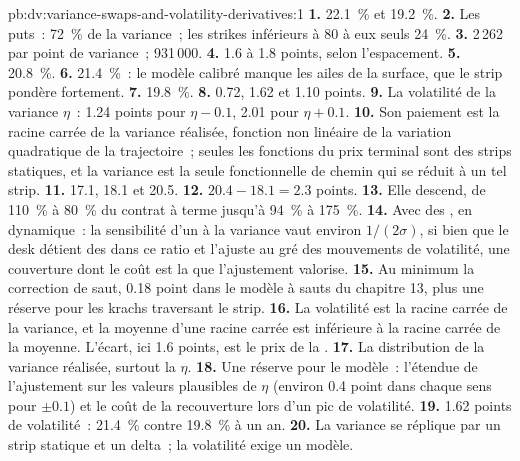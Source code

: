 \begin{solution}{pb:dv:variance-swaps-and-volatility-derivatives:1}
\textbf{1.} 22.1~\% et 19.2~\%.
\textbf{2.} Les puts~: 72~\% de la variance~; les strikes inférieurs à 80 à eux seuls 24~\%.
\textbf{3.} 2\,262 par point de variance~; 931\,000.
\textbf{4.} 1.6 à 1.8 points, selon l'espacement.
\textbf{5.} 20.8~\%.
\textbf{6.} 21.4~\%~: le modèle calibré manque les ailes de la surface, que le strip pondère fortement.
\textbf{7.} 19.8~\%.
\textbf{8.} 0.72, 1.62 et 1.10 points.
\textbf{9.} La volatilité de la variance $\eta$~: 1.24 points pour $\eta-0.1$, 2.01 pour $\eta+0.1$.
\textbf{10.} Son paiement est la racine carrée de la variance réalisée, fonction non linéaire de la variation quadratique
de la trajectoire~; seules les fonctions du prix terminal sont des strips statiques, et la variance est la seule fonctionnelle
de chemin qui se réduit à un tel strip.
\textbf{11.} 17.1, 18.1 et 20.5.
\textbf{12.} $20.4-18.1=2.3$ points.
\textbf{13.} Elle descend, de 110~\% à 80~\% du contrat à terme jusqu'à 94~\% à 175~\%.
\textbf{14.} Avec des , en dynamique~: la sensibilité d'un  à la variance vaut environ
$1/(2\sigma)$, si bien que le desk détient des  dans ce ratio et l'ajuste au gré des mouvements de volatilité, une couverture dont
le coût est la  que l'ajustement valorise.
\textbf{15.} Au minimum la correction de saut, 0.18 point dans le modèle à sauts du chapitre 13, plus une réserve pour les krachs
traversant le strip.
\textbf{16.} La volatilité est la racine carrée de la variance, et la moyenne d'une racine carrée est inférieure à la racine carrée de
la moyenne. L'écart, ici 1.6 points, est le prix de la .
\textbf{17.} La distribution de la variance réalisée, surtout la  $\eta$.
\textbf{18.} Une réserve pour le modèle~: l'étendue de l'ajustement sur les valeurs plausibles de $\eta$ (environ 0.4 point dans chaque sens pour $\pm0.1$)
et le coût de la recouverture lors d'un pic de volatilité.
\textbf{19.} 1.62 points de volatilité~: 21.4~\% contre 19.8~\% à un an.
\textbf{20.} La variance se réplique par un strip statique et un delta~; la volatilité exige un modèle.
\end{solution}

